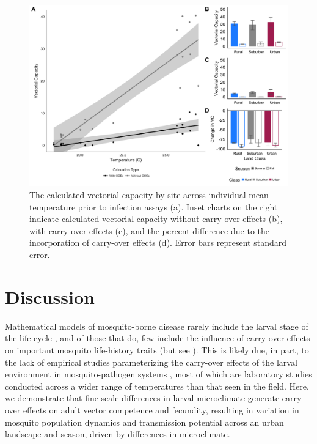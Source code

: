\documentclass[12pt]{article}
\begin{document}
\begin{figure}
\centering\includegraphics[width=0.9\linewidth]{Figure5.png}
\caption{The calculated vectorial capacity by site across individual mean temperature prior to infection assays (a). Inset charts on the right indicate calculated vectorial capacity without carry-over effects (b), with carry-over effects (c), and the percent difference due to the incorporation of carry-over effects (d). Error bars represent standard error.}
\label{Fig:VC}
\end{figure}

\section{Discussion}

Mathematical models of mosquito-borne disease rarely include the larval stage of the life cycle \citep{reiner2013}, and of those that do, few include the influence of carry-over effects on important mosquito life-history traits (but see \citealt{roux2015a}). This is likely due, in part, to the lack of empirical studies parameterizing the carry-over effects of the larval environment in mosquito-pathogen systems \citep{parham2015}, most of which are laboratory studies conducted across a wider range of temperatures than that seen in the field. Here, we demonstrate that fine-scale differences in larval microclimate generate carry-over effects on adult vector competence and fecundity, resulting in variation in mosquito population dynamics and transmission potential across an urban landscape and season, driven by differences in microclimate.
\end{document}
